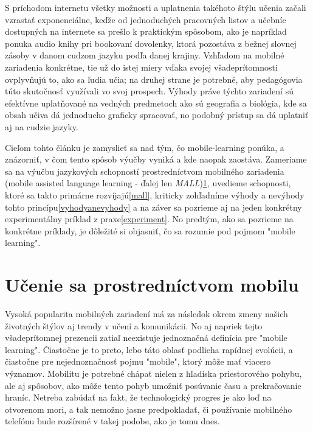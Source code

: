\documentclass[10pt,oneside,slovak,a4paper]{article}
\begin{document}
S príchodom internetu všetky možnosti a uplatnenia takéhoto štýlu učenia začali vzrastať exponenciálne, keďže od jednoduchých pracovných listov a učebníc dostupných na internete sa prešlo k praktickým spôsobom, ako je napríklad ponuka audio knihy pri bookovaní dovolenky, ktorá pozostáva z bežnej slovnej zásoby v danom cudzom jazyku podľa danej krajiny. Vzhľadom na mobilné zariadenia konkrétne, tie už do istej miery vďaka svojej všadeprítomnosti ovplyvňujú to, ako sa ľudia učia; na druhej strane je potrebné, aby pedagógovia túto skutočnosť využívali vo svoj prospech\cite{KukulskaHulme2009}. Výhody práve týchto zariadení sú efektívne uplatňované na vedných predmetoch ako sú geografia a biológia, kde sa obsah učiva dá jednoducho graficky spracovať, no podobný prístup sa dá uplatniť aj na cudzie jazyky.

Cieľom tohto článku je zamyslieť sa nad tým, čo mobile-learning ponúka, a znázorniť, v čom tento spôsob výučby vyniká a kde naopak zaostáva. Zameriame sa na výučbu jazykových schopností prostredníctvom mobilného zariadenia (mobile assisted language learning - ďalej len \emph{MALL})\ref{ml}, uvedieme schopnosti, ktoré sa takto primárne rozvíjajú\ref{mall}, kriticky zohľadníme výhody a nevýhody tohto princípu\ref{vyhodyanevyhody} a na záver sa pozrieme aj na jeden konkrétny experimentálny príklad z praxe\ref{experiment}. No predtým, ako sa pozrieme na konkrétne príklady, je dôležité si objasniť, čo sa rozumie pod pojmom "mobile learning".


\section{Učenie sa prostredníctvom mobilu} \label{ml}

Vysoká popularita mobilných zariadení má za následok okrem zmeny našich životných štýlov aj trendy v učení a komunikácii. No aj napriek tejto všadeprítomnej prezencii zatiaľ neexistuje jednoznačná definícia pre "mobile learning"\cite{Kim2012}. Čiastočne je to preto, lebo táto oblasť podlieha rapídnej evolúcii, a čiastočne pre nejednoznačnosť pojmu "mobile", ktorý môže mať viacero významov\cite{KukulskaHulme2009}. Mobilitu je potrebné chápať nielen z hľadiska priestorového pohybu, ale aj spôsobov, ako môže tento pohyb umožniť posúvanie času a prekračovanie hraníc\cite{KukulskaHulme2009}. Netreba zabúdať na fakt, že technologický progres je ako loď na otvorenom mori, a tak nemožno jasne predpokladať, či používanie mobilného telefónu bude rozšírené v takej podobe, ako je tomu dnes. 
\end{document}
